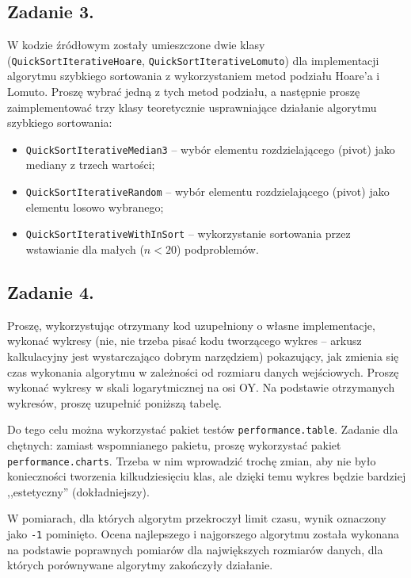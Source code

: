 \documentclass[twoside]{article}
\begin{document}
\subsection{Zadanie 3.}
W kodzie źródłowym zostały umieszczone dwie klasy (\verb|QuickSortIterativeHoare|, \verb|QuickSortIterativeLomuto|) 
dla implementacji algorytmu szybkiego sortowania z wykorzystaniem metod podziału Hoare'a i Lomuto.
Proszę wybrać jedną z tych metod podziału, a następnie proszę zaimplementować trzy klasy
teoretycznie usprawniające działanie algorytmu szybkiego sortowania:

\begin{itemize}
    \item \verb|QuickSortIterativeMedian3| -- wybór elementu rozdzielającego (pivot) jako mediany z trzech wartości;
    \item \verb|QuickSortIterativeRandom| -- wybór elementu rozdzielającego (pivot) jako elementu losowo wybranego;
    \item \verb|QuickSortIterativeWithInSort| -- wykorzystanie sortowania przez wstawianie dla małych ($n < 20$) podproblemów.
\end{itemize}

\subsection{Zadanie 4.}
Proszę, wykorzystując otrzymany kod uzupełniony o własne implementacje, wykonać wykresy (nie, nie trzeba pisać kodu tworzącego wykres -- arkusz kalkulacyjny jest wystarczająco dobrym narzędziem)
pokazujący, jak zmienia się czas wykonania algorytmu w zależności od rozmiaru danych wejściowych.
Proszę wykonać wykresy w skali logarytmicznej na osi OY.
Na podstawie otrzymanych wykresów, proszę uzupełnić poniższą tabelę.

Do tego celu można wykorzystać pakiet testów \verb|performance.table|.
Zadanie dla chętnych: zamiast wspomnianego pakietu, proszę wykorzystać pakiet \verb|performance.charts|. 
Trzeba w nim wprowadzić trochę zmian, aby nie było konieczności tworzenia kilkudziesięciu klas, ale dzięki temu
wykres będzie bardziej ,,estetyczny'' (dokładniejszy).

W pomiarach, dla których algorytm przekroczył limit czasu, wynik oznaczony jako
\verb|-1| pominięto. Ocena najlepszego i najgorszego algorytmu została wykonana
na podstawie poprawnych pomiarów dla największych rozmiarów danych, dla których
porównywane algorytmy zakończyły działanie.
\end{document}
